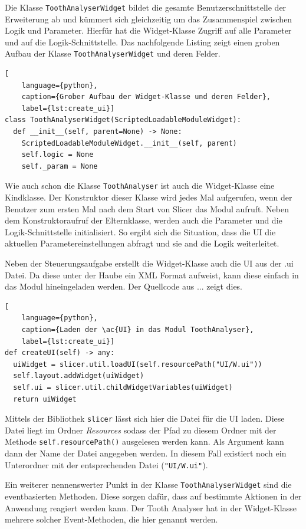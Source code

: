 Die Klasse \texttt{ToothAnalyserWidget} bildet die gesamte Benutzerschnittstelle
der Erweiterung ab und kümmert sich gleichzeitig um das Zusammenspiel zwischen
Logik und Parameter. Hierfür hat die Widget-Klasse Zugriff auf alle Parameter und
auf die Logik-Schnittstelle. Das nachfolgende Listing zeigt einen groben Aufbau
der Klasse \texttt{ToothAnalyserWidget} und deren Felder.

\begin{lstlisting}[
    language={python},
    caption={Grober Aufbau der Widget-Klasse und deren Felder},
    label={lst:create_ui}]
class ToothAnalyserWidget(ScriptedLoadableModuleWidget):
  def __init__(self, parent=None) -> None:
    ScriptedLoadableModuleWidget.__init__(self, parent)
    self.logic = None
    self._param = None
\end{lstlisting}

Wie auch schon die Klasse \texttt{ToothAnalyser} ist auch die Widget-Klasse eine
Kindklasse. Der Konstruktor dieser Klasse wird jedes Mal aufgerufen, wenn der Benutzer
zum ersten Mal nach dem Start von Slicer das Modul aufruft. Neben dem
Konstruktoraufruf der Elternklasse, werden auch die Parameter und die Logik-Schnittstelle
initialisiert. So ergibt sich die Situation, dass die UI die aktuellen Parametereinstellungen
abfragt und sie and die Logik weiterleitet.

Neben der Steuerungsaufgabe erstellt die Widget-Klasse auch die UI aus der .ui
Datei. Da diese unter der Haube ein XML Format aufweist, kann diese einfach in
das Modul hineingeladen werden. Der Quellcode aus ... zeigt dies.

\begin{lstlisting}[
    language={python},
    caption={Laden der \ac{UI} in das Modul ToothAnalyser},
    label={lst:create_ui}]
def createUI(self) -> any:
  uiWidget = slicer.util.loadUI(self.resourcePath("UI/W.ui"))
  self.layout.addWidget(uiWidget)
  self.ui = slicer.util.childWidgetVariables(uiWidget)
  return uiWidget
\end{lstlisting}

Mittels der Bibliothek \texttt{slicer} lässt sich hier die Datei für die \ac{UI}
laden. Diese Datei liegt im Ordner \textit{Resources} sodass der Pfad zu diesem
Ordner mit der Methode \texttt{self.resourcePath()} ausgelesen werden kann. Als
Argument kann dann der Name der Datei angegeben werden. In diesem Fall existiert
noch ein Unterordner mit der entsprechenden Datei (\texttt{"UI/W.ui"}).

Ein weiterer nennenswerter Punkt in der Klasse \texttt{ToothAnalyserWidget} sind
die eventbasierten Methoden. Diese sorgen dafür, dass auf bestimmte Aktionen in der
Anwendung reagiert werden kann. Der Tooth Analyser hat in der Widget-Klasse
mehrere solcher Event-Methoden, die hier genannt werden.

